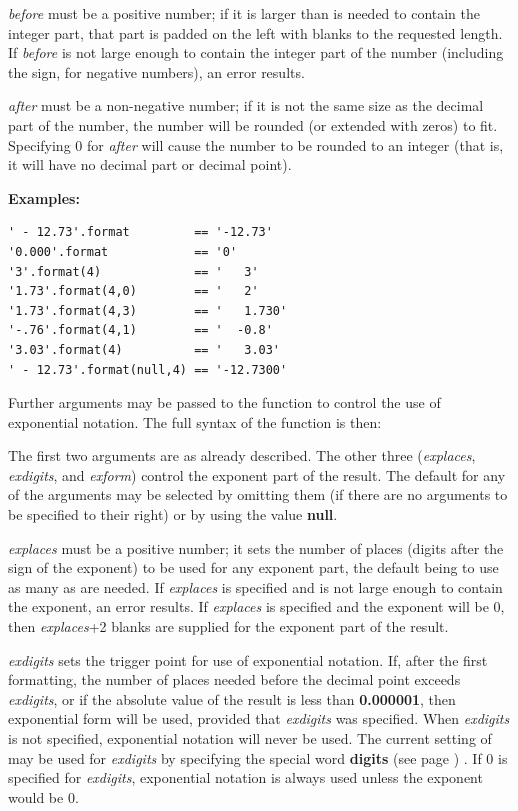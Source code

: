 \begin{description}
\emph{before} must be a positive number; if it is larger than is
needed to contain the integer part, that part is padded on the left with
blanks to the requested length.
If \emph{before} is not large enough to contain the integer part
of the number (including the sign, for negative numbers), an error
results.
 
\emph{after} must be a non-negative number; if it is not the same
size as the decimal part of the number, the number will be rounded (or
extended with zeros) to fit.  Specifying 0 for \emph{after} will
cause the number to be rounded to an integer (that is, it will have no
decimal part or decimal point).
 
\textbf{Examples:}
\begin{lstlisting}
' - 12.73'.format         == '-12.73'
'0.000'.format            == '0'
'3'.format(4)             == '   3'
'1.73'.format(4,0)        == '   2'
'1.73'.format(4,3)        == '   1.730'
'-.76'.format(4,1)        == '  -0.8'
'3.03'.format(4)          == '   3.03'
' - 12.73'.format(null,4) == '-12.7300'
\end{lstlisting}
 
Further arguments may be passed to the  function to control
the use of exponential notation.
The full syntax of the function is then:
 
 The first two arguments are as already described.  The other three
(\emph{explaces}, \emph{exdigits}, and \emph{exform})
control the exponent part of the result.  The default for any of the
arguments may be selected by omitting them (if there are no arguments to
be specified to their right) or by using the value \textbf{null}.
 
\emph{explaces} must be a positive number; it sets the number of
places (digits after the sign of the exponent) to be used for any
exponent part, the default being to use as many as are needed.
If \emph{explaces} is specified and is not large enough to contain
the exponent, an error results.
If \emph{explaces} is specified and the exponent will be 0,
then \emph{explaces}+2 blanks are supplied for the exponent
part of the result.
 
\emph{exdigits} sets the trigger point for use of exponential
notation.
If, after the first formatting, the number of places needed before the
decimal point exceeds \emph{exdigits}, or if the absolute value of
the result is less than \textbf{0.000001}, then exponential form will
be used, provided that \emph{exdigits} was specified.
When \emph{exdigits} is not specified, exponential notation
will never be used.
The current setting of  may be used for
\emph{exdigits} by specifying the special word
 \textbf{digits} (see page \pageref{refswdigit}) .
If 0 is specified for \emph{exdigits}, exponential
notation is always used unless the exponent would be 0.
 

\end{description}
